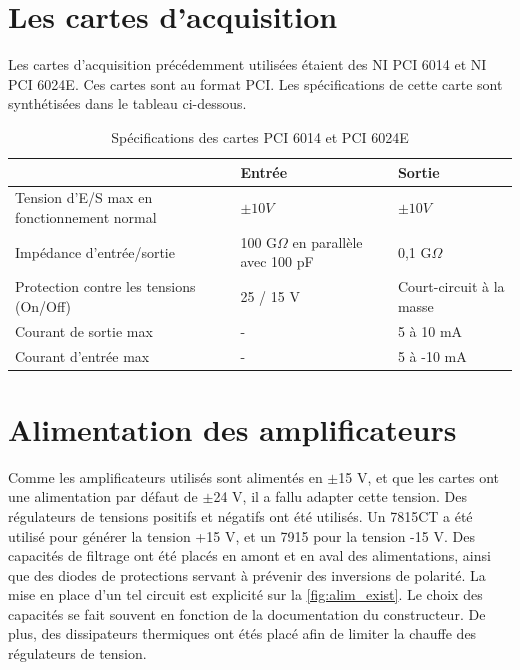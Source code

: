 \documentclass{report}
\begin{document}
\section{Les cartes d'acquisition}
Les cartes d'acquisition précédemment utilisées étaient des NI PCI 6014 et NI PCI 6024E. Ces cartes sont au format PCI. Les spécifications de cette carte sont synthétisées dans le tableau ci-dessous.

\begin{center}
\begin{table}[h!]
\begin{tabular}{l|l|l|}
\cline{2-3}
                                                                 & Entrée                                 & Sortie                   \\ \hline
\multicolumn{1}{|l|}{Tension d'E/S max en fonctionnement normal} & $\pm 10 V$                             & $\pm 10 V$               \\ \hline
\multicolumn{1}{|l|}{Impédance d'entrée/sortie}                  & 100 G$\Omega$ en parallèle avec 100 pF & 0,1 G$\Omega$            \\ \hline
\multicolumn{1}{|l|}{Protection contre les tensions (On/Off)}    & 25 / 15 V                              & Court-circuit à la masse \\ \hline
\multicolumn{1}{|l|}{Courant de sortie max}                      & -                                      & 5 à 10 mA                \\ \hline
\multicolumn{1}{|l|}{Courant d'entrée max}                       & -                                      & 5 à -10 mA               \\ \hline
\end{tabular}
\caption{Spécifications des cartes PCI 6014 et PCI 6024E}
\end{table}
\end{center}

\section{Alimentation des amplificateurs}
Comme les amplificateurs utilisés sont alimentés en $\pm$15 V, et que les cartes ont une alimentation par défaut de $\pm$24 V, il a fallu adapter cette tension. Des régulateurs de tensions positifs et négatifs ont été utilisés. Un 7815CT a été utilisé pour générer la tension +15 V, et un 7915 pour la tension -15 V. Des capacités de filtrage ont été placés en amont et en aval des alimentations, ainsi que des diodes de protections servant à prévenir des inversions de polarité. La mise en place d'un tel circuit est explicité sur la  \ref{fig:alim_exist}. Le choix des capacités se fait souvent en fonction de la documentation du constructeur. De plus, des dissipateurs thermiques ont étés placé afin de limiter la chauffe des régulateurs de tension.
\end{document}
